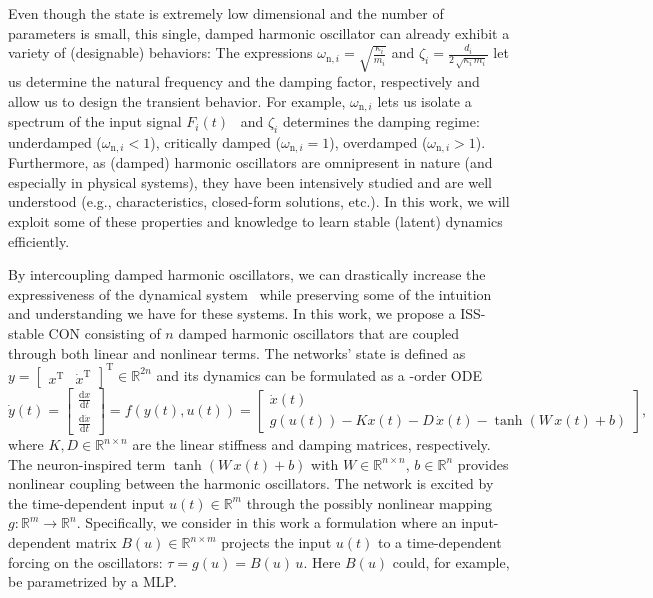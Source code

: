 Even though the state is extremely low dimensional and the number of parameters is small, this single, damped harmonic oscillator can already exhibit a variety of (designable) behaviors:
The expressions $\omega_{\mathrm{n},i} = \sqrt{\frac{\kappa_i}{m_i}}$ and $\zeta_i = \frac{d_i}{2 \, \sqrt{\kappa_i \, m_i}}$ let us determine the natural frequency and the damping factor, respectively and allow us to design the transient behavior. For example, $\omega_{\mathrm{n},i}$ lets us isolate a spectrum of the input signal $F_i(t)$~\cite{ceni2024random} and $\zeta_i$ determines the damping regime: underdamped ($\omega_{\mathrm{n},i} < 1$), critically damped ($\omega_{\mathrm{n},i} = 1$), overdamped ($\omega_{\mathrm{n},i} > 1$). 
Furthermore, as (damped) harmonic oscillators are omnipresent in nature (and especially in physical systems), they have been intensively studied and are well understood (e.g., characteristics, closed-form solutions, etc.). 
In this work, we will exploit some of these properties and knowledge to learn stable (latent) dynamics efficiently.

By intercoupling damped harmonic oscillators, we can drastically increase the expressiveness of the dynamical system~\cite{rusch2020coupled, ceni2024random, lanthaler2024neural} while preserving some of the intuition and understanding we have for these systems. In this work, we propose a \gls{ISS}-stable \gls{CON} consisting of $n$ damped harmonic oscillators that are coupled through both linear and nonlinear terms. The networks' state is defined as $y = \begin{bmatrix}
    x^\mathrm{T} & \dot{x}^\mathrm{T}
\end{bmatrix}^\mathrm{T} \in \mathbb{R}^{2n}$ and its dynamics can be formulated as a -order \gls{ODE}
\begin{equation}\label{eq:con:con_dynamics}
    \dot{y}(t) = \begin{bmatrix}
        \frac{\mathrm{d}x}{\mathrm{d}t}\\
        \frac{\mathrm{d}\dot{x}}{\mathrm{d}t}
    \end{bmatrix} = f(y(t), u(t)) = \begin{bmatrix}
        \dot{x}(t)\\
        g(u(t)) -K x(t) - D \, \dot{x}(t) - \tanh(W \, x(t) + b)
    \end{bmatrix},
\end{equation}
where $K, D \in \mathbb{R}^{n \times n}$ are the linear stiffness and damping matrices, respectively. The neuron-inspired term $\tanh(W \, x(t) + b)$ with $W \in \mathbb{R}^{n \times n}$, $b \in \mathbb{R}^n$ provides nonlinear coupling between the harmonic oscillators.
The network is excited by the time-dependent input $u(t) \in \mathbb{R}^m$ through the possibly nonlinear mapping $g: \mathbb{R}^m \to \mathbb{R}^n$.
Specifically, we consider in this work a formulation where an input-dependent matrix $B(u) \in \mathbb{R}^{n \times m}$ projects the input $u(t)$ to a time-dependent forcing on the oscillators: $\tau = g(u) = B(u) \, u$. Here $B(u)$ could, for example, be parametrized by a \gls{MLP}.

